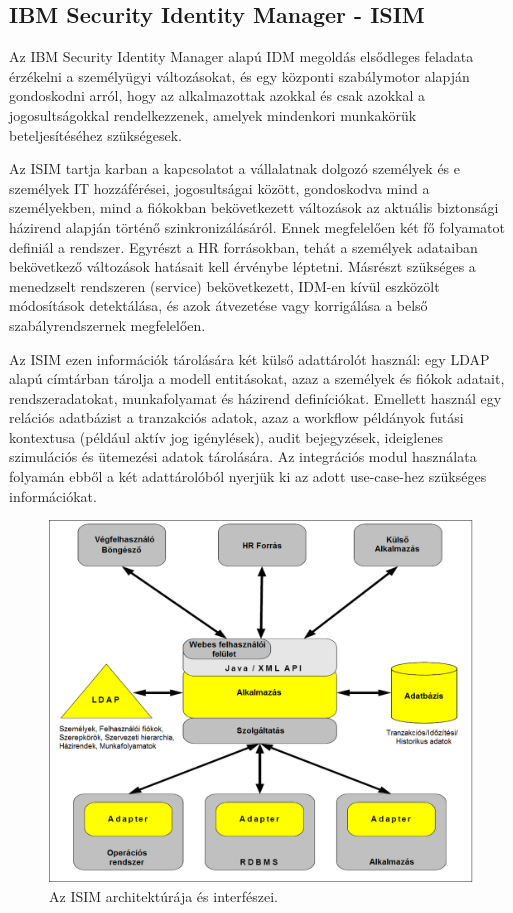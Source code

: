 \subsection{IBM Security Identity Manager - ISIM}
\label{subsec:ISIM}
Az IBM Security Identity Manager alapú IDM megoldás elsődleges feladata érzékelni a személyügyi változásokat, és egy központi szabálymotor alapján gondoskodni arról, hogy az alkalmazottak azokkal és csak azokkal a jogosultságokkal rendelkezzenek, amelyek mindenkori munkakörük beteljesítéséhez szükségesek.\cite{isimdoc}

Az ISIM tartja karban a kapcsolatot a vállalatnak dolgozó személyek és e személyek IT hozzáférései, jogosultságai között, gondoskodva mind a személyekben, mind a fiókokban bekövetkezett változások az aktuális biztonsági házirend alapján történő szinkronizálásáról. Ennek megfelelően két fő folyamatot definiál a rendszer.
Egyrészt a HR forrásokban, tehát a személyek adataiban bekövetkező változások hatásait kell érvénybe léptetni. Másrészt szükséges a menedzselt rendszeren (service) bekövetkezett, IDM-en kívül eszközölt módosítások detektálása, és azok átvezetése vagy korrigálása a belső szabályrendszernek megfelelően. 

Az ISIM ezen információk tárolására két külső adattárolót használ: egy LDAP alapú címtárban tárolja a modell entitásokat, azaz a személyek és fiókok adatait, rendszeradatokat, munkafolyamat és házirend definíciókat. Emellett használ egy relációs adatbázist a tranzakciós adatok, azaz a workflow példányok futási kontextusa (például aktív jog igénylések), audit bejegyzések, ideiglenes szimulációs és ütemezési adatok tárolására. Az integrációs modul használata folyamán ebből a két adattárolóból nyerjük ki az adott use-case-hez szükséges információkat.

\begin{figure}
	\centering
	\includegraphics[width=0.5\linewidth]{figures/ISIM_promo.png}
	\caption{Az ISIM architektúrája és interfészei.}
	\label{fig:isim-promo}
\end{figure}


